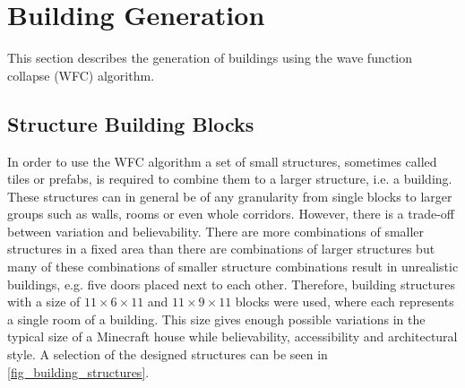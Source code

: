 \documentclass[
oneside,
fontsize=11pt
]{scrartcl}
\begin{document}



\section{Building Generation}
This section describes the generation of buildings using the wave function collapse (WFC) algorithm.



\subsection{Structure Building Blocks}
In order to use the WFC algorithm a set of small structures, sometimes called tiles or prefabs, 
is required to combine them to a larger structure, i.e. a building. 
These structures can in general be of any granularity from single blocks 
to larger groups such as walls, rooms or even whole corridors. 
However, there is a trade-off between variation and believability.
There are more combinations of smaller structures in a fixed area 
than there are combinations of larger structures 
but many of these combinations of smaller structure combinations 
result in unrealistic buildings, e.g. five doors placed next to each other. 
Therefore, building structures with a size of 
$11 \times 6 \times 11$ and $11 \times 9 \times 11$  blocks 
were used, where each represents a single room of a building.  
This size gives enough possible variations in the typical size of a Minecraft house 
while believability, accessibility and architectural style. 
A selection of the designed structures can be seen in \autoref{fig_building_structures}.
\end{document}
